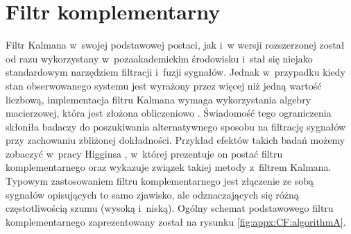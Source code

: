 \section*{Filtr komplementarny}\label{sec:appx:filters:CF}
Filtr Kalmana w~swojej podstawowej postaci, jak i~w wersji rozszerzonej został od razu wykorzystany w~pozaakademickim środowisku i~stał się niejako standardowym narzędziem filtracji i~fuzji sygnałów. Jednak w~przypadku kiedy stan obserwowanego systemu jest wyrażony przez więcej niż jedną wartość liczbową, implementacja filtru Kalmana wymaga wykorzystania algebry macierzowej, która jest złożona obliczeniowo \cite{wiki:MatrixAlgebraComplexity2016}. Świadomość tego ograniczenia skłoniła badaczy do poszukiwania alternatywnego sposobu na filtrację sygnałów przy zachowaniu zbliżonej dokładności. Przykład efektów takich badań możemy zobaczyć w~pracy Higginsa \cite{Higgins1975}, w~której prezentuje on postać filtru komplementarnego oraz wykazuje związek takiej metody z~filtrem Kalmana. Typowym zastosowaniem filtru komplementarnego jest złączenie ze sobą sygnałów opisujących to samo zjawisko, ale odznaczających się różną częstotliwością szumu (wysoką i~niską). Ogólny schemat podstawowego filtru komplementarnego zaprezentowany został na rysunku \ref{fig:appx:CF:algorithmA}.
		
\newcommand{\suma}{\Large$+$}
\newcommand{\inte}{$\displaystyle \int$}
\newcommand{\derv}{\huge$\frac{d}{dt}$}
		
